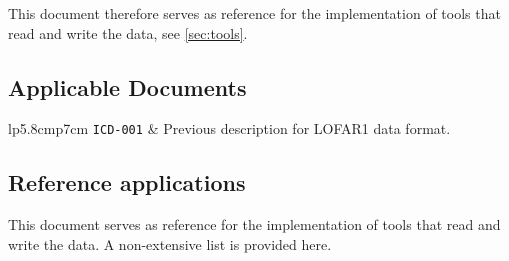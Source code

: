 \documentclass[a4paper,10pt,bibtotoc]{scrartcl}
\begin{document}
This document therefore serves as reference for the
implementation of tools that read and write the data, see \ref{sec:tools}.


\subsection{Applicable Documents}


\begin{center}
  \tablelasttail{\hline}
  \begin{supertabular}{lp{5.8cm}p{7cm}}
    \shrinkheight{-4.5em}
    \texttt{ICD-001} \cite{lofar.icd.001} & Previous description for LOFAR1 data format. \\
    \hline
  \end{supertabular}
\end{center}

\subsection{Reference applications}
This document serves as reference for the
implementation of tools that read and write the data. A non-extensive list is provided here.
\end{document}
